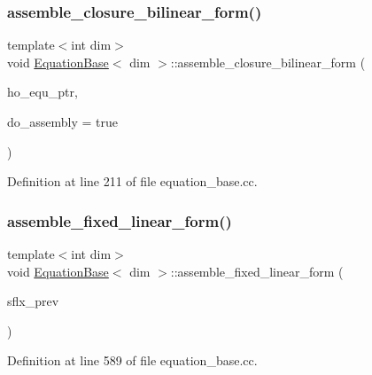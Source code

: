 \subsubsection{\texorpdfstring{assemble\+\_\+closure\+\_\+bilinear\+\_\+form()}{assemble\_closure\_bilinear\_form()}}
{\footnotesize\ttfamily template$<$int dim$>$ \\
void \hyperlink{class_equation_base}{Equation\+Base}$<$ dim $>$\+::assemble\+\_\+closure\+\_\+bilinear\+\_\+form (\begin{DoxyParamCaption}\item[{std\+\_\+cxx11\+::shared\+\_\+ptr$<$ \hyperlink{class_equation_base}{Equation\+Base}$<$ dim $>$ $>$}]{ho\+\_\+equ\+\_\+ptr,  }\item[{bool}]{do\+\_\+assembly = {\ttfamily true} }\end{DoxyParamCaption})}



Definition at line 211 of file equation\+\_\+base.\+cc.

\mbox{\label{class_equation_base_aa6a5d3dd752c1e2389b329c141c44ee7}} 
\subsubsection{\texorpdfstring{assemble\+\_\+fixed\+\_\+linear\+\_\+form()}{assemble\_fixed\_linear\_form()}}
{\footnotesize\ttfamily template$<$int dim$>$ \\
void \hyperlink{class_equation_base}{Equation\+Base}$<$ dim $>$\+::assemble\+\_\+fixed\+\_\+linear\+\_\+form (\begin{DoxyParamCaption}\item[{std\+::vector$<$ Vector$<$ double $>$ $>$ \&}]{sflx\+\_\+prev }\end{DoxyParamCaption})\hspace{0.3cm}{\ttfamily [virtual]}}



Definition at line 589 of file equation\+\_\+base.\+cc.

\mbox{\label{class_equation_base_ac590b2065d95ea03fcf411c965e6cfd9}} 
